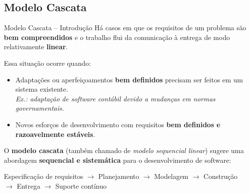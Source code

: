 \documentclass[9pt]{beamer}
\begin{document}
\subsection{Modelo Cascata}
\begin{frame}{Modelo Cascata -- Introdução}
  Há casos em que os requisitos de um problema são \textbf{bem compreendidos} e o trabalho flui da comunicação à entrega de modo relativamente \textbf{linear}.

  \vspace{0.3cm}
  Essa situação ocorre quando:
  \begin{itemize}
    \item Adaptações ou aperfeiçoamentos \textbf{bem definidos} precisam ser feitos em um sistema existente.\\
          \scriptsize \textit{Ex.: adaptação de software contábil devido a mudanças em normas governamentais.}
    \normalsize
    \item Novos esforços de desenvolvimento com requisitos \textbf{bem definidos e razoavelmente estáveis}.
  \end{itemize}

  \vspace{0.3cm}
  O \textbf{modelo cascata} (também chamado de \textit{modelo sequencial linear}) sugere uma abordagem \textbf{sequencial e sistemática} para o desenvolvimento de software:

  \vspace{0.2cm}
  \centering
  \scriptsize
  Especificação de requisitos $\rightarrow$ Planejamento $\rightarrow$ Modelagem $\rightarrow$ Construção $\rightarrow$ Entrega $\rightarrow$ Suporte contínuo
\end{frame}
\end{document}
